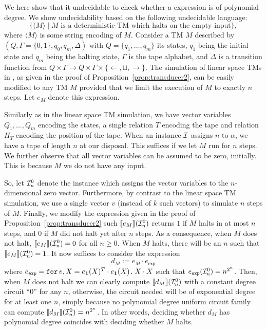 We here show that it undecidable to check whether a \langfor expression is of polynomial degree.
We show undecidability based on the following undecidable language:
    $$
    \{ \langle M\rangle\mid \text{$M$ is a deterministic TM which halts on the empty input}\},
    $$
    where $\langle M\rangle$ is some string encoding of $M$.
    Consider a TM $M$ described by $(Q,\Gamma=\{0,1\},q_0,q_m,\Delta)$
    with $Q=\{q_1,\ldots,q_m\}$ its states, $q_1$ being the initial state and $q_m$ being
    the halting state, $\Gamma$ is the tape alphabet, and $\Delta$ is a transition function
    from $Q\times \Gamma\to Q\times\Gamma\times \{\leftarrow,\sqcup,\rightarrow\}$. The simulation
    of linear space TMs in \langfor, as given in the proof of Proposition~\ref{prop:transducer2}, can be easily modified to
    any TM $M$ provided that we limit the execution of $M$ to exactly $n$ steps. Let $e_M$ denote this expression. 
	
	Similarly
    as in the linear space TM simulation, we have vector variables $Q_1,\ldots,Q_m$ encoding the
    states, a single relation $T$ encoding the tape and relation $H_T$ encoding the position
    of the tape.  When an instance $\mathcal{I}$ assigns $n$ to $\alpha$, we have a tape of length $n$ at our disposal. This suffices if we let $M$ run for $n$ steps. We further observe that all vector variables can be assumed to be zero, initially.
    This is because $M$ we do not have any input. 
	
	So, let $\mathcal{I}_n^0$ denote the instance which assigns the vector variables to the $n$-dimensional zero vector.  Furthermore, by contrast to the linear space TM simulation, we use a single vector $v$ (instead of $k$ such vectors) to simulate $n$ steps of $M$. Finally, we modify the expression given in the proof of Proposition~\ref{prop:transducer2} such $\llbracket e_M \rrbracket(\mathcal{I}_n^0)$  returns $1$ if $M$
    halts in at most $n$ steps, and $0$ if $M$ did not halt yet after $n$ steps.
    As a consequence, when $M$ does not halt, $\llbracket e_M \rrbracket(\mathcal{I}_n^0)=0$ for all $n\geq 0$. When $M$ halts, there will be an $n$ such that $\llbracket e_M \rrbracket(\mathcal{I}_n^0)=1$. It now suffices to consider the \langfor expression
    $$
    d_M:=e_M\cdot e_{\mathsf{exp}}
    $$
    where $e_{\texttt{exp}} = \texttt{for}\, v,X=e_{\mathbf{1}}(X)^T\cdot e_{\mathbf{1}}(X) \texttt{.}\, X\cdot X$ such that
    $e_{\texttt{exp}}(\mathcal{I}_n^0)=n^{2^n}$. Then, when $M$ does not halt we can clearly compute $\llbracket d_M \rrbracket(\mathcal{I}_n^0)$ with a constant degree circuit ``0''
    for any $n$, otherwise, the circuit needed will be of exponential degree
    for at least one $n$, simply because no polynomial degree uniform  circuit family can compute $\llbracket d_M \rrbracket(\mathcal{I}_n^0)=n^{2^n}$. In other words, deciding whether $d_M$ has polynomial degree coincides with deciding whether $M$ halts.
